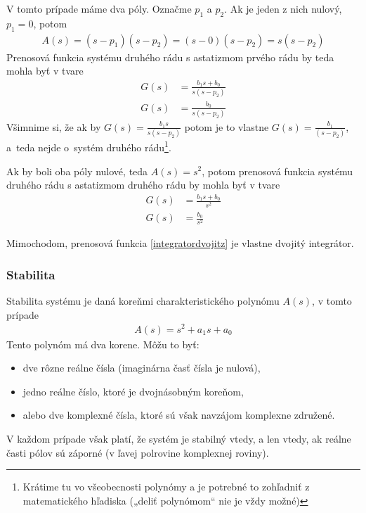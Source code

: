 \documentclass[a4paper, 10pt, ]{article}
\begin{document}
V tomto prípade máme dva póly. Označme $p_1$ a $p_2$. Ak je jeden z nich nulový, $p_1 = 0$, potom
\begin{align}
    A(s) = (s - p_1)(s - p_2) = (s -0)(s - p_2) = s(s - p_2)
\end{align}
Prenosová funkcia systému druhého rádu s astatizmom prvého rádu by teda mohla byť v tvare
\begin{subequations}
    \begin{align}
        G(s) &= \frac{b_1 s + b_0}{s(s - p_2)} \\
        G(s) &= \frac{b_0}{s(s - p_2)}
    \end{align}
\end{subequations}
Všimnime si, že ak by $G(s) = \frac{b_1 s}{s(s - p_2)}$ potom je to vlastne $G(s) = \frac{b_1}{(s - p_2)}$, a~teda nejde o~systém druhého rádu\footnote{Krátime tu vo všeobecnosti polynómy a je potrebné to zohľadniť z matematického hľadiska („deliť polynómom“ nie je vždy možné)}.

Ak by boli oba póly nulové, teda $A(s) = s^2$, potom prenosová funkcia systému druhého rádu s astatizmom druhého rádu by mohla byť v tvare
\begin{subequations}
    \begin{align}
        G(s) &= \frac{b_1 s + b_0}{s^2} \\
        G(s) &= \frac{b_0}{s^2} \label{integratordvojitz}
    \end{align}
\end{subequations}

Mimochodom, prenosová funkcia \eqref{integratordvojitz} je vlastne dvojitý integrátor.



\subsubsection{Stabilita}

Stabilita systému je daná koreňmi charakteristického polynómu $A(s)$, v tomto prípade
\begin{align}
    A(s) = s^2 + a_1 s + a_0
\end{align}
Tento polynóm má dva korene. Môžu to byť:
\begin{itemize}[leftmargin=0pt, labelsep=3mm, itemsep=0pt]
    \item dve rôzne reálne čísla (imaginárna časť čísla je nulová),
    \item jedno reálne číslo, ktoré je dvojnásobným koreňom,
    \item alebo dve komplexné čísla, ktoré sú však navzájom komplexne združené.
\end{itemize}
V každom prípade však platí, že systém je stabilný vtedy, a len vtedy, ak reálne časti pólov sú záporné (v ľavej polrovine komplexnej roviny).
\end{document}
